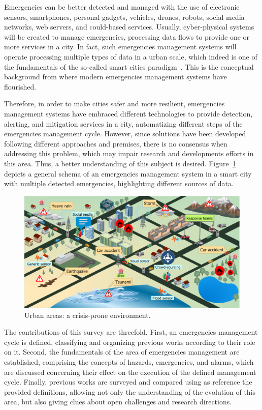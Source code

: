 \begin{refsection}
Emergencies can be better detected and managed with the use of electronic sensors, smartphones, personal gadgets, vehicles, drones, robots, social media networks, web servers, and could-based services. Usually, cyber-physical systems will be created to manage emergencies, processing data flows to provide one or more services in a city. In fact, such emergencies management systems will operate processing multiple types of data in a urban scale, which indeed is one of the fundamentals of the so-called smart cities paradigm~\cite{smartcities4}. This is the conceptual background from where modern emergencies management systems have flourished.

Therefore, in order to make cities safer and more resilient, emergencies management systems have embraced different technologies to provide detection, alerting, and mitigation services in a city, automatizing different steps of the emergencies management cycle. However, since solutions have been developed following different approaches and premises, there is no consensus when addressing this problem, which may impair research and developments efforts in this area. Thus, a better understanding of this subject is desired. Figure~\ref{Fig:general} depicts a general schema of an emergencies management system in a smart city with multiple detected emergencies, highlighting different sources of data.

\begin{figure}[htbp]
  \centering
  \includegraphics[scale=0.35]{Chapters/2-Survey/images/general.pdf}
  \caption{Urban areas: a crisis-prone environment.}\label{Fig:general}
\end{figure}

The contributions of this survey are threefold. First, an emergencies management cycle is defined, classifying and organizing previous works according to their role on it. Second, the fundamentals of the area of emergencies management are established, comprising the concepts of hazards, emergencies, and alarms, which are discussed concerning their effect on the execution of the defined management cycle. Finally, previous works are surveyed and compared using as reference the provided definitions, allowing not only the understanding of the evolution of this area, but also giving clues about open challenges and research directions.


\end{refsection}
